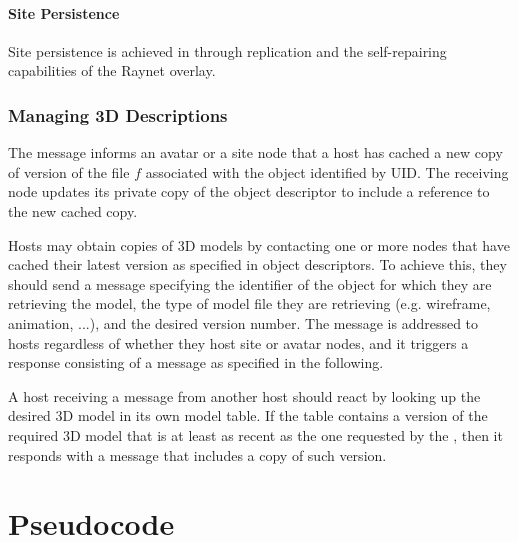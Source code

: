 \paragraph{Site Persistence}
Site persistence is achieved in \sol through replication and the
self-repairing capabilities of the Raynet overlay. 

\subsubsection{Managing 3D Descriptions}


\msgentry{\ncache}
\desc

The \ncache message informs an avatar or a site node that a host has
cached a new copy of \vn version of the file $f$ associated with the
object identified by UID. 
The receiving node updates its private copy of the object descriptor
to include a reference to the new cached copy. 



\msgentry{\modreq}
\desc

Hosts may obtain copies of 3D models by contacting one or more nodes
that have cached their latest version as specified in object
descriptors. To achieve this, they should send a \modreq message
specifying  the identifier of the object for which they are retrieving
the model, the type of model file they are retrieving (e.g. wireframe,
animation, ...), and the desired version number. 
The message is addressed to hosts regardless of whether they host site
or avatar nodes, and it triggers a response consisting of a \modrep
message as specified in the following.


\msgentry{\modrep}
\desc

A host receiving a \modreq message from another host should react by
looking up the desired 3D model in its own model table. If the table
contains a version of the required 3D model that is at least as recent
as the one requested by the \modreq, then it responds with a \modrep
message that includes a copy of such version. 




\section{Pseudocode}



